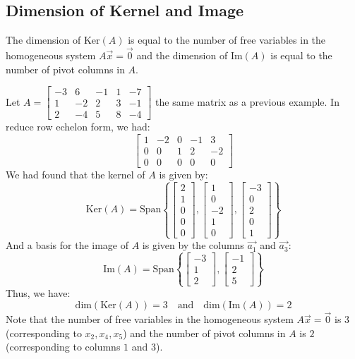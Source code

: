 \subsection{Dimension of Kernel and Image}
\begin{theorem}
    The dimension of Ker$(A)$ is equal to the number of free variables in the homogeneous system $A\vec{x} = \vec{0}$ and the dimension of Im$(A)$ is equal to the number of pivot columns in $A$.
\end{theorem}

\begin{eg}
    Let $A = \begin{bmatrix}
        -3 & 6 & -1 & 1 & -7 \\
        1 & -2 & 2 & 3 & -1 \\
        2 & -4 & 5 & 8 & -4
    \end{bmatrix}$ the same matrix as a previous example. In reduce row echelon form, we had:
    \[ \begin{bmatrix}
        1 & -2 & 0 & -1 & 3 \\
        0 & 0 & 1 & 2 & -2 \\
        0 & 0 & 0 & 0 & 0
    \end{bmatrix} \]
    We had found that the kernel of $A$ is given by:
    \[ \text{Ker}(A) = \text{Span}\left\{ \begin{bmatrix}
        2 \\ 1 \\ 0 \\ 0 \\ 0
    \end{bmatrix}, \begin{bmatrix}
        1 \\ 0 \\ -2 \\ 1 \\ 0
    \end{bmatrix}, \begin{bmatrix}
        -3 \\ 0 \\ 2 \\ 0 \\ 1
    \end{bmatrix} \right\} \]
    And a basis for the image of $A$ is given by the columns $\vec{a_1}$ and $\vec{a_3}$:
    \[ \text{Im}(A) = \text{Span}\left\{ \begin{bmatrix}
        -3 \\ 1 \\ 2
    \end{bmatrix}, \begin{bmatrix}
        -1 \\ 2 \\ 5
    \end{bmatrix} \right\} \]
    Thus, we have:
    \[ \text{dim}(\text{Ker}(A)) = 3 \quad \text{and} \quad \text{dim}(\text{Im}(A)) = 2 \]
    Note that the number of free variables in the homogeneous system $A\vec{x} = \vec{0}$ is $3$ (corresponding to $x_2, x_4, x_5$) and the number of pivot columns in $A$ is $2$ (corresponding to columns $1$ and $3$).
\end{eg}

